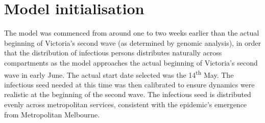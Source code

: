 \section{Model initialisation}
The model was commenced from around one to two weeks earlier than the actual beginning of Victoria's second wave (as determined by genomic analysis), in order that the distribution of infectious persons distributes naturally across compartments as the model approaches the actual beginning of Victoria's second wave in early June. The actual start date selected was the 14\textsuperscript{th} May. The infectious seed needed at this time was then calibrated to ensure dynamics were realistic at the beginning of the second wave. The infectious seed is distributed evenly across metropolitan services, consistent with the epidemic's emergence from Metropolitan Melbourne.